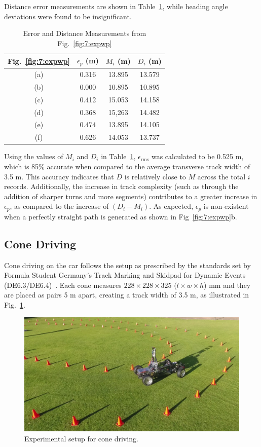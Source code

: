 Distance error measurements are shown in Table~\ref{tbl:7:waypoint}, while heading angle deviations were found to be insignificant.

\begin{table}[H]
	\caption{Error and Distance Measurements from Fig.~\ref{fig:7:expwp}}
	\label{tbl:7:waypoint}
	\centering
	\begin{tabular}{cccc}
		\toprule
		Fig.~\ref{fig:7:expwp} & $\epsilon_p$ (m) & $M_i$ (m) & $D_i$ (m) \\
		\midrule
		(a)  & 0.316 & 13.895 & 13.579 \\
		(b)  & 0.000 & 10.895 & 10.895 \\
		(c)  & 0.412 & 15.053 & 14.158 \\
		(d)  & 0.368 & 15,263 & 14.482 \\
		(e)  & 0.474 & 13.895 & 14.105 \\
		(f)  & 0.626 & 14.053 & 13.737 \\
		\bottomrule
	\end{tabular}
\end{table}

Using the values of $M_i$ and $D_i$ in Table~\ref{tbl:7:waypoint}, $\epsilon_\textrm{rms}$ was calculated to be 0.525 m, which is 85\% accurate when compared to the average transverse track width of 3.5 m. This accuracy indicates that $D$ is relatively close to $M$ across the total $i$ records. Additionally, the increase in track complexity (such as through the addition of sharper turns and more segments) contributes to a greater increase in $\epsilon_p$, as compared to the increase of $(D_i-M_i)$. As expected, $\epsilon_p$ is non-existent when a perfectly straight path is generated as shown in Fig~\ref{fig:7:expwp}b.

\subsection{Cone Driving}\label{sec:7:benchcone}
Cone driving on the car follows the setup as prescribed by the standards set by Formula Student Germany's Track Marking and Skidpad for Dynamic Events (DE6.3/DE6.4)~\cite{formula_student_germany_gmbh_fsg_2018}. Each cone measures $228 \times 228 \times 325$ ($l\times w \times h$) \si{\milli\meter} and they are placed as pairs 5 \si{\meter} apart, creating a track width of 3.5 \si{\meter}, as illustrated in Fig.~\ref{fig:7:conedrone}.

\begin{figure}[H]
	\centering
	\includegraphics[width=0.8\linewidth]{dronecones_cropped}
	\caption{Experimental setup for cone driving.}
	\label{fig:7:conedrone}
\end{figure}

